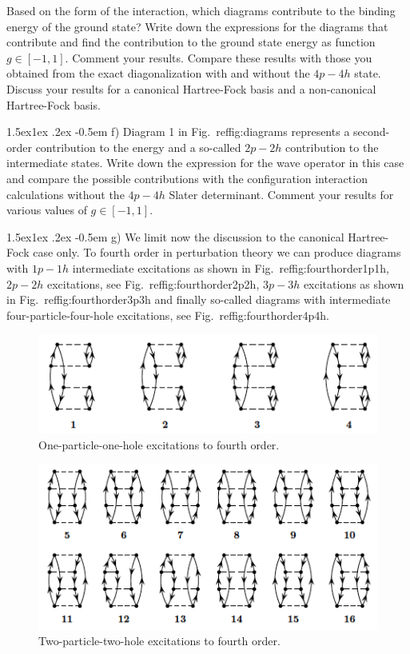 \documentclass[%
twoside,                 %
final,                   %
10pt]{article}
\makeatletter
\newenvironment{doconceexercise}{}{}
\newcommand\subex{\@startsection{paragraph}{4}{\z@}%
                  {1.5ex\@plus1ex \@minus.2ex}%
                  {-0.5em}%
                  {\normalfont\normalsize\bfseries}}
\makeatother
\begin{document}
\begin{doconceexercise}
Based on the form of the interaction, which diagrams contribute to the
binding energy of the ground state?  Write down the expressions for
the diagrams that contribute and find the contribution to the ground
state energy as function $g\in [-1,1]$. Comment your results.  Compare
these results with those you obtained from the exact diagonalization with and without the $4p-4h$ state.
Discuss your results for a canonical Hartree-Fock basis and a non-canonical Hartree-Fock basis.

\subex{f)}
Diagram 1 in Fig.~ref{fig:diagrams} represents a second-order contribution to the energy and a so-called $2p-2h$ contribution to the intermediate states. Write down the expression for the wave operator in this case and compare the possible contributions with the configuration interaction calculations without the $4p-4h$ Slater determinant. Comment your results for 
various values of $g\in [-1,1]$.

\subex{g)}
We limit now the discussion to the canonical Hartree-Fock case only. To fourth order in perturbation theory we can produce diagrams with $1p-1h$ intermediate excitations as shown in Fig.~ref{fig:fourthorder1p1h}, $2p-2h$ excitations, see Fig.~ref{fig:fourthorder2p2h}, $3p-3h$ excitations as shown in Fig.~ref{fig:fourthorder3p3h} and finally so-called diagrams with intermediate four-particle-four-hole excitations, see Fig.~ref{fig:fourthorder4p4h}. 


\begin{figure}[t]
  \centerline{\includegraphics[width=0.6\linewidth]{fig-proj/fourthorder1p1h.png}}
  \caption{
  One-particle-one-hole excitations to fourth order. \label{fig:fourthorder1p1h}
  }
\end{figure}



\begin{figure}[t]
  \centerline{\includegraphics[width=0.6\linewidth]{fig-proj/fourthorder2p2h.png}}
  \caption{
  Two-particle-two-hole excitations to fourth order. \label{fig:fourthorder2p2h}
  }
\end{figure}




\end{doconceexercise}
\end{document}

